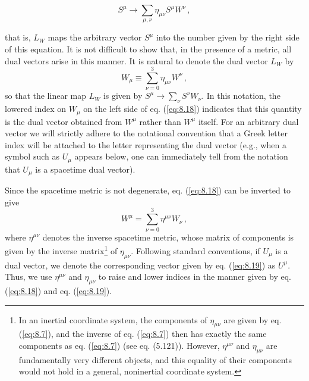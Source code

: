 \begin{equation}\label{eq:8.17}
S^\mu \rightarrow \sum_{\mu, \nu} \eta_{\mu \nu} S^\mu W^\nu\,,
\end{equation}

that is, $L_W$ maps the arbitrary vector $S^\mu$ into the number given by the right side of this equation. It is not difficult to show that, in the presence of a metric, all dual vectors arise in this manner. It is natural to denote the dual vector $L_W$ by 
\begin{equation}\label{eq:8.18}
W_\mu \equiv \sum_{\nu = 0}^3 \eta_{\mu \nu} W^\nu\,,
\end{equation}
so that the linear map $L_W$ is given by $S^\mu \rightarrow \sum_\nu S^\nu W_\nu$. In this notation, the lowered index on $W_\mu$ on the left side of eq. (\ref{eq:8.18}) indicates that this quantity is the dual vector obtained from $W^\mu$ rather than $W^\mu$ itself. For an arbitrary dual vector we will strictly adhere to the notational convention that a  Greek letter index will be attached to the letter representing the dual vector (e.g., when a symbol such as $U_\mu$ appears below, one can immediately tell from the notation that $U_\mu$ is a spacetime dual vector).

Since the spacetime metric is not degenerate, eq. (\ref{eq:8.18}) can be inverted to give
\begin{equation}\label{eq:8.19}
W^\mu = \sum_{\nu = 0}^3 \eta^{\mu \nu} W_\nu\,,
\end{equation}
where $\eta^{\mu \nu}$ denotes the inverse spacetime metric, whose matrix of components is given by the inverse matrix\footnote{In an inertial coordinate system, the components of $\eta_{\mu \nu}$ are given by eq. (\ref{eq:8.7}), and the inverse of eq. (\ref{eq:8.7}) then has exactly the same components as eq. (\ref{eq:8.7}) (see eq. (5.121)). However, $\eta^{\mu \nu}$ and $\eta_{\mu \nu}$ are fundamentally very different objects, and this equality of their components would not hold in a general, noninertial coordinate system.} of $\eta_{\mu \nu}$. Following standard conventions, if $U_\mu$ is a dual vector, we denote the corresponding vector given by eq. (\ref{eq:8.19}) as $U^\mu$. Thus, we use $\eta^{\mu \nu}$ and $\eta_{\mu \nu}$ to raise and lower indices in the manner given by eq. (\ref{eq:8.18}) and eq. (\ref{eq:8.19}).

